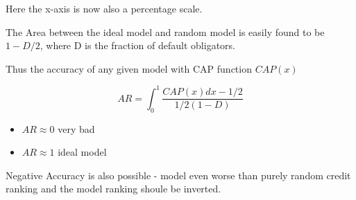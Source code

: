 Here the x-axis is now also a percentage scale.

The Area between the ideal model and random model is easily found to be $1-D/2$, where D is the fraction of default obligators.

Thus the accuracy of any given model with CAP function $CAP(x)$

\[ AR = \int^{1}_{0} \frac{CAP(x)dx - 1/2}{1/2(1-D)}\]

\begin{itemize}
\item $AR \approx 0$ very bad
\item $AR \approx 1$ ideal model
\end{itemize}


Negative Accuracy is also possible - model even worse than purely random credit ranking and the model ranking shoule be inverted.

